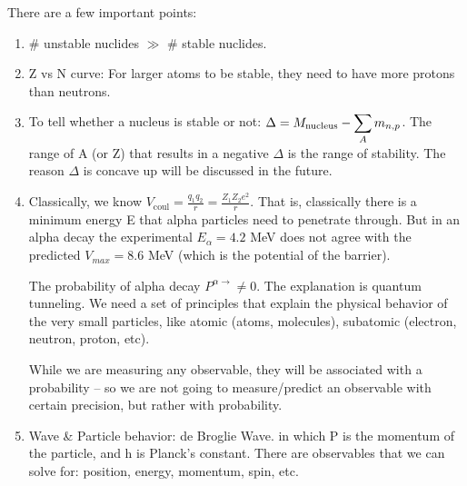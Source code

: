\documentclass{school-22.101-notes}
\begin{document}
There are a few important points:
\begin{enumerate}
\item \# unstable nuclides $\gg$ \# stable nuclides.
\item Z vs N curve: For larger atoms to be stable, they need to have more protons than neutrons. 
\item To tell whether a nucleus is stable or not: $\Delta = M_{\mathrm{nucleus}} - \displaystyle\sum_A m_{n,p} $. The range of A (or Z) that results in a negative $\Delta$ is the range of stability. The reason $\Delta$ is concave up will be discussed in the future.
\item Classically, we know $V_{\mathrm{coul}} = \frac{q_1 q_2}{r} = \frac{Z_1 Z_2 e^2}{r}$. That is, classically there is a minimum energy E that alpha particles need to penetrate through. But in an alpha decay  the experimental $E_{\alpha} = 4.2$ MeV does not agree with the predicted $V_{max} = 8.6$ MeV (which is the potential of the barrier).

The probability of alpha decay $P^{\alpha \to} \neq 0$. The explanation is quantum tunneling. We need a set of principles that explain the physical behavior of the very small particles, like atomic (atoms, molecules), subatomic (electron, neutron, proton, etc). 

While we are measuring any observable, they will be associated with a probability -- so we are not going to measure/predict an observable with certain precision, but rather with probability. 

\item Wave \& Particle behavior: de Broglie Wave.
in which P is the momentum of the particle, and h is Planck's constant. There are observables that we can solve for: position, energy, momentum, spin, etc. 
\end{enumerate}


\end{document}

